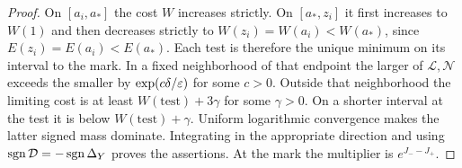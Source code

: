 \begin{proof}
On $[a_i,a_*]$ the cost $W$ increases strictly. On $[a_*,z_i]$
it first increases to $W(1)$ and then decreases strictly to
$W(z_i)=W(a_i)<W(a_*)$, since $E(z_i)=E(a_i)<E(a_*)$.
Each test is therefore the unique minimum on its interval to the mark. In a fixed neighborhood of that endpoint the larger of
$\mathcal L,\mathcal N$ exceeds the smaller by $\exp(c\delta/\varepsilon)$ for some $c>0$.
Outside that neighborhood the limiting cost is at least
$W(\text{test})+3\gamma$ for some $\gamma>0$. On a shorter interval
at the test it is below $W(\text{test})+\gamma$.
Uniform logarithmic convergence makes the latter signed mass dominate.
Integrating in the appropriate direction and using
$\operatorname{sgn}\mathcal{D}=-\operatorname{sgn} \Delta_Y$ proves the assertions. At the mark the multiplier
is $e^{J_--J_+}$.
\end{proof}
